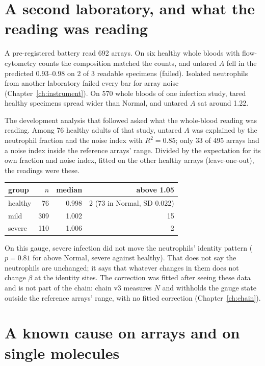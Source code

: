 \section{A second laboratory, and what the reading was reading}

A pre-registered battery read 692 arrays. On six healthy whole bloods with flow-cytometry counts the composition
matched the counts, and untared $A$ fell in the predicted 0.93--0.98 on 2 of 3 readable specimens (failed). Isolated neutrophils from another laboratory
failed every bar for array noise (Chapter~\ref{ch:instrument}). On 570 whole bloods of one infection study, tared healthy specimens spread wider than
Normal, and untared $A$ sat around 1.22. \measured

The development analysis that followed asked what the whole-blood reading was reading. Among 76 healthy adults of that study, untared $A$
was explained by the neutrophil fraction and the noise index with $R^2=0.85$; only 33 of 495 arrays had a noise index inside the reference arrays' range. Divided by the
expectation for its own fraction and noise index, fitted on the other healthy arrays (leave-one-out), the readings were these. \measured
\begin{center}\small
\begin{tabular}{@{}lrrr@{}}\toprule
group & $n$ & median & above 1.05 \\\midrule
healthy & 76 & 0.998 & 2 (73 in Normal, SD 0.022) \\
mild & 309 & 1.002 & 15 \\
severe & 110 & 1.006 & 2 \\\bottomrule
\end{tabular}
\end{center}
On this gauge, severe infection did not move the neutrophils' identity pattern ($p=0.81$ for above Normal, severe against healthy). That does not say the neutrophils are
unchanged; it says that whatever changes in them does not change $\beta$ at the identity sites. The correction was fitted after seeing these data and is not part of the chain: chain v3 measures $N$ and withholds the gauge state outside
the reference arrays' range, with no fitted correction (Chapter~\ref{ch:chain}). \fitted

\section{A known cause on arrays and on single molecules}

